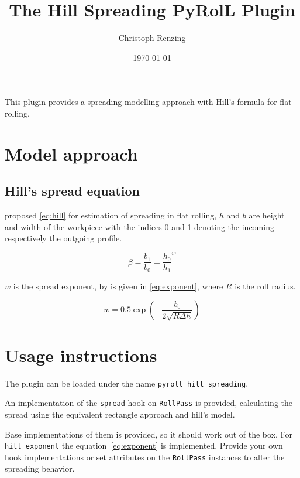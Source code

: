 \documentclass[11pt]{PyRollDocs}
\begin{document}
    \title{The Hill Spreading PyRolL Plugin}
    \author{Christoph Renzing}
    \date{\today}

    \maketitle

    This plugin provides a spreading modelling approach with Hill's formula for flat rolling.


    \section{Model approach}\label{sec:model-approach}

    \subsection{Hill's spread equation}\label{subsec:hill's-spread-equation}

    \textcite{Hill1955} proposed \autoref{eq:hill} for estimation of spreading in flat rolling,
    $h$ and $b$ are height and width of the workpiece with the indices 0 and 1 denoting the incoming respectively the outgoing profile.

    \begin{equation}
        \beta = \frac{b_1}{b_0} = \frac{h_0}{h_1} ^{w}
        \label{eq:hill}
    \end{equation}
    

    $w$ is the spread exponent, by \textcite{Hill1955} is given in \autoref{eq:exponent}, where $R$ is the roll radius.

    \begin{equation}
        w = 0.5 \exp \left( - \frac{b_0}{2 \sqrt{R \Delta h}} \right)
        \label{eq:exponent}
    \end{equation}

    \section{Usage instructions}\label{sec:usage-instructions}

    The plugin can be loaded under the name \texttt{pyroll\_hill\_spreading}.

    An implementation of the \lstinline{spread} hook on \lstinline{RollPass} is provided,
    calculating the spread using the equivalent rectangle approach and hill's model.

    Base implementations of them is provided, so it should work out of the box.
    For \lstinline{hill_exponent} the equation~\ref{eq:exponent} is implemented.
    Provide your own hook implementations or set attributes on the \lstinline{RollPass} instances to alter the spreading behavior.

    \printbibliography
\end{document}

